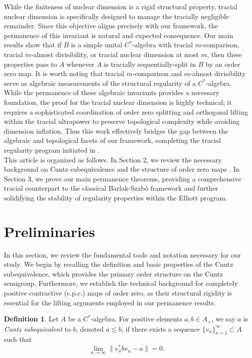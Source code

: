 \documentclass[12pt]{amsart}
\theoremstyle{plain}
\theoremstyle{definition}
\newtheorem{defn}[thm]{Definition}
\numberwithin{equation}{section}
\begin{document}
\noindent 
While the finiteness of nuclear dimension is a rigid structural property, tracial nuclear dimension is specifically designed to manage the tracially negligible remainder. Since this objective aligns precisely with our framework, the permanence of this  invariant is natural and expected consequence. Our main results show that if $B$ is a simple unital $C^*$-algebra with tracial $m$-comparison, tracial $m$-almost divisibility, or tracial nuclear dimension at most $m$, then these properties pass to $A$ whenever $A$ is tracially sequentially-split in $B$ by an order zero map. It is worth noting that tracial $m$-comparison and $m$-almost divisibility serve as algebraic measurements of the structural regularity of a $C^*$-algebra. While the permanence of these algebraic invariants provides a necessary foundation, the proof for the tracial nuclear dimension is highly technical; it requires a sophisticated coordination of order zero splitting and orthogonal lifting within the tracial ultrapower to preserve topological complexity while avoiding dimension inflation. Thus this work effectively bridges the gap between the algebraic and topological facets of our framework, completing the tracial regularity program initiated in \cite{LO1}.\\

\noindent 
This article is organized as follows. In Section 2, we review the necessary background on Cuntz subequivalence and the structure of order zero maps \cite{WZ}. In Section 3, we prove our main permanence theorems, providing a comprehensive tracial counterpart to the classical Barlak-Szabó framework and further solidifying the stability of regularity properties within the Elliott program.    
          
\section{Preliminaries}\label{S:2}

In this section, we review the fundamental tools and notation necessary for our study. We begin by recalling the definition and basic properties of the Cuntz subequivalence, which provides the primary order structure on the Cuntz semigroup. Furthermore, we establish the technical background for completely positive contractive (c.p.c.) maps of order zero, as their structural rigidity is essential for the lifting arguments employed in our permanence results.
\begin{defn}
Let $A$ be a $C^*$-algebra. For positive elements $a, b \in A_+$, we say $a$ is \textit{Cuntz subequivalent} to $b$, denoted $a \lesssim b$, if there exists a sequence $\{v_n\}_{n=1}^{\infty} \subset A$ such that 
\[ \lim_{n \to \infty} \| v_n^* b v_n - a \| = 0. \]
\end{defn}
\end{document}
